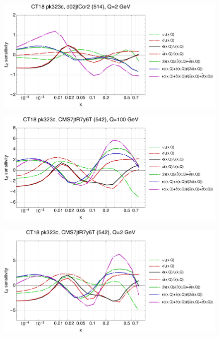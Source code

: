 \documentclass[10pt,aps,prd,floatfix,titlepage]{revtex4}
\begin{document}
\begin{figure}
\includegraphics[width=\textwidth,height=0.44\textheight,keepaspectratio]{2/514_ct18nn_q2_Sf_2.pdf}
\caption{}
\end{figure}
\clearpage
\begin{figure}
\includegraphics[width=\textwidth,height=0.44\textheight,keepaspectratio]{2/542_ct18nn_q100_Sf_2.pdf}
\caption{}
\end{figure}
\begin{figure}
\includegraphics[width=\textwidth,height=0.44\textheight,keepaspectratio]{2/542_ct18nn_q2_Sf_2.pdf}
\caption{}
\end{figure}
\end{document}
